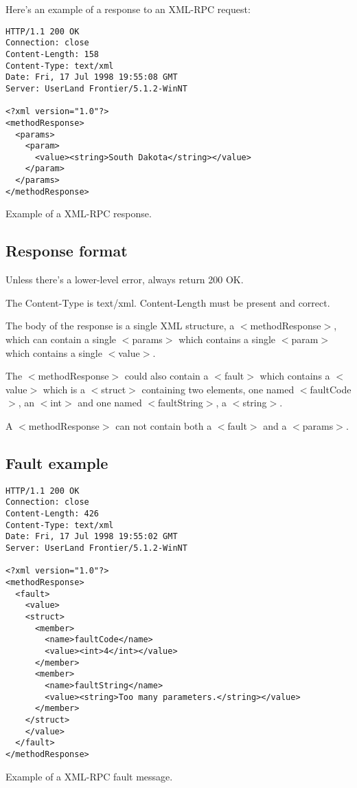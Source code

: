 Here's an example of a response to an XML-RPC request:
\begin{code}
\begin{verbatim}
HTTP/1.1 200 OK
Connection: close
Content-Length: 158
Content-Type: text/xml
Date: Fri, 17 Jul 1998 19:55:08 GMT
Server: UserLand Frontier/5.1.2-WinNT

<?xml version="1.0"?>
<methodResponse>
  <params>
    <param>
      <value><string>South Dakota</string></value>
    </param>
  </params>
</methodResponse>
\end{verbatim}
\caption{Example of a XML-RPC response.}
\end{code}

\subsection{Response format}

Unless there's a lower-level error, always return 200 OK.

The Content-Type is text/xml. Content-Length must be present and correct.

The body of the response is a single XML structure, a $<$methodResponse$>$, which can contain a single $<$params$>$ which contains a single $<$param$>$ which contains a single $<$value$>$.

The $<$methodResponse$>$ could also contain a $<$fault$>$ which contains a $<$value$>$ which is a $<$struct$>$ containing two elements, one named $<$faultCode$>$, an $<$int$>$ and one named $<$faultString$>$, a $<$string$>$.

A $<$methodResponse$>$ can not contain both a $<$fault$>$ and a $<$params$>$.
\subsection{Fault example}
\begin{code}
\begin{verbatim}
HTTP/1.1 200 OK
Connection: close
Content-Length: 426
Content-Type: text/xml
Date: Fri, 17 Jul 1998 19:55:02 GMT
Server: UserLand Frontier/5.1.2-WinNT

<?xml version="1.0"?>
<methodResponse>
  <fault>
    <value>
    <struct>
      <member>
        <name>faultCode</name>
        <value><int>4</int></value>
      </member>
      <member>
        <name>faultString</name>
        <value><string>Too many parameters.</string></value>
      </member>
    </struct>
    </value>
  </fault>
</methodResponse>
\end{verbatim}
\caption{Example of a XML-RPC fault message.}
\end{code}


